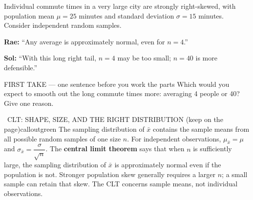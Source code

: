 \documentclass[11pt]{article}
\begin{document}


Individual commute times in a very large city are strongly right-skewed, with population mean $\mu=25$ minutes and standard deviation $\sigma=15$ minutes. Consider independent random samples.\par\smallskip \textbf{Rae:} ``Any average is approximately normal, even for $n=4$.''\par \textbf{Sol:} ``With this long right tail, $n=4$ may be too small; $n=40$ is more defensible.''\par
\begin{center}
\end{center}
\begin{firsttakebox}{FIRST TAKE --- one sentence before you work the parts}
Which would you expect to smooth out the long commute times more: averaging 4 people or 40? Give one reason.
\workspace{0.9in}
\end{firsttakebox}

\begin{callout}{\IconBook\ CLT: SHAPE, SIZE, AND THE RIGHT DISTRIBUTION (keep on the page)}{calloutgreen}
The sampling distribution of $\bar{x}$ contains the sample means from all possible random samples of one size $n$.
For independent observations, $\mu_{\bar{x}}=\mu$ and $\sigma_{\bar{x}}=\dfrac{\sigma}{\sqrt{n}}$.
The \textbf{central limit theorem} says that when $n$ is sufficiently large, the sampling distribution of
$\bar{x}$ is approximately normal even if the population is not. Stronger population skew generally requires
a larger $n$; a small sample can retain that skew. The CLT concerns sample means, not individual observations.
\end{callout}
\end{document}
